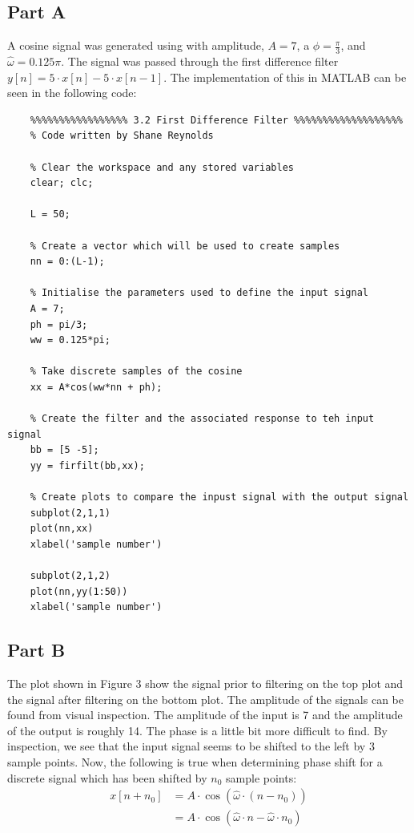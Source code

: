 \documentclass{article}
\begin{document}
\subsection{Part A}
A cosine signal was generated using with amplitude, $A = 7$, a $\phi = \frac{\pi}{3}$, and $\hat{\omega} = 0.125 \pi$. The signal was passed through the first difference filter $y[n] = 5 \cdot x[n] - 5 \cdot x[n-1]$. The implementation of this in MATLAB can be seen in the following code:

\begin{lstlisting}
	%%%%%%%%%%%%%%%%% 3.2 First Difference Filter %%%%%%%%%%%%%%%%%%%
	% Code written by Shane Reynolds
	
	% Clear the workspace and any stored variables
	clear; clc;
	
	L = 50;
	
	% Create a vector which will be used to create samples
	nn = 0:(L-1);
	
	% Initialise the parameters used to define the input signal
	A = 7;
	ph = pi/3;
	ww = 0.125*pi;
	
	% Take discrete samples of the cosine
	xx = A*cos(ww*nn + ph);
	
	% Create the filter and the associated response to teh input signal
	bb = [5 -5];
	yy = firfilt(bb,xx);
	
	% Create plots to compare the inpust signal with the output signal
	subplot(2,1,1)
	plot(nn,xx)
	xlabel('sample number')
	
	subplot(2,1,2)
	plot(nn,yy(1:50))
	xlabel('sample number')
\end{lstlisting}

\subsection{Part B}
The plot shown in Figure 3 show the signal prior to filtering on the top plot and the signal after filtering on the bottom plot. The amplitude of the signals can be found from visual inspection. The amplitude of the input is 7 and the amplitude of the output is roughly 14. The phase is a little bit more difficult to find. By inspection, we see that the input signal seems to be shifted to the left by 3 sample points. Now, the following is true when determining phase shift for a discrete signal which has been shifted by $n_0$ sample points:
\begin{align*}
	x[n + n_0]  &= A \cdot \cos(\hat{\omega} \cdot (n - n_0))\\
				&= A \cdot \cos(\hat{\omega} \cdot n - \hat{\omega} \cdot n_0)
\end{align*}
\end{document}
